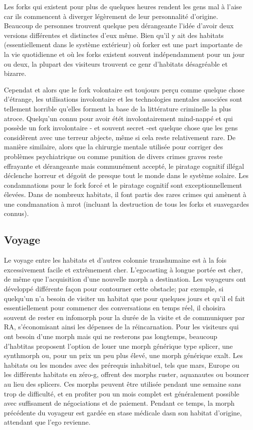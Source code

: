 Les forks qui existent pour plus de quelques heures rendent les gens mal à l'aise car ils commencent à diverger légèrement de leur personnalité d'origine. Beaucoup de personnes trouvent quelque peu dérangeante l'idée d'avoir deux versions différentes et distinctes d'eux même. Bien qu'il y ait des habitats (essentiellement dans le système extérieur) où forker est une part importante de la vie quotidienne et où les forks existent souvent indépendamment pour un jour ou deux, la plupart des visiteurs trouvent ce genr d'habitats désagréable et bizarre. 

Cependat et alors que le fork volontaire est toujours perçu comme quelque chose d'étrange, les utilisations involontaire et les technologies mentales associées sont tellement horrible qu'elles forment la base de la littérature criminelle la plus atroce. Quelqu'un connu pour avoir étét involontairement mind-nappé et qui possède un fork involontaire - et souvent secret -est quelque chose que les gens considèrent avec une terreur abjecte, même si cela reste relativement rare. De manière similaire, alors que la chirurgie mentale utilisée pour corriger des problèmes psychiatrique ou comme punition de divers crimes graves reste effrayante et dérangeante mais communément accepté, le piratage cognitif illégal déclenche horreur et dégoüt de presque tout le monde dans le système solaire. Les condamnations pour le fork forcé et le piratage cognitif sont exceptionnellement élevées. Dans de nombreux habitats, il font partis des rares crimes qui amènent à une condmanation à mrot (incluant la destruction de tous les forks et suavegardes connus). 

\subsection{Voyage} \label{sec:travel} 

Le voyage entre les habitats et d'autres colonnie transhumaine est à la fois excessivement facile et extrêmement cher. L'egocasting à longue portée est cher, de même que l'acquisition d'une nouvelle morph a destination. Les voyageurs ont développé différente façon pour contourner cette obstacle; par exemple, si quelqu'un n'a besoin de visiter un habitat que pour quelques jours et qu'il el fait essentiellement pour commencr des conversations en temps réel, il choisira souvent de rester en infomorph pour la durée de la visite et de communiquer par RA, s'économisant ainsi les dépenses de la réincarnation. Pour les visiteurs qui ont besoin d'une morph mais qui ne resterons pas longtemps, beaucoup d'habtitas proposent l'option de louer une morph générique type splicer, une synthmorph ou, pour un prix un peu plus élevé, une morph générique exalt. Les habitats ou les mondes avec des prérequis inhabituel, tels que mars, Europe ou les différents habitats en zéro-g, offrent des morphs ruster, aquanautes ou bouncer au lieu des splicers. Ces morphs peuvent être utilisée pendant une semaine sans trop de difficulté, et en profiter pou un mois complet est généralement possible avec suffisament de négociations et de paiement. Pendant ce temps, la morph précédente du voyageur est gardée en stase médicale dasn son habitat d'origine, attendant que l'ego revienne. 

